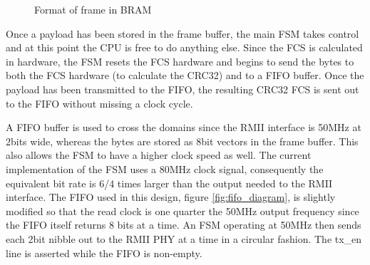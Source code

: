 \begin{figure}[h!]
    \centering
    \caption{Format of frame in BRAM}
    \label{fig:bram_frame_format}
\end{figure}


Once a payload has been stored in the frame buffer, the main FSM takes control and at this point the CPU is free to do anything else. Since the FCS is calculated in hardware, the FSM resets the FCS hardware and begins to send the bytes to both the FCS hardware (to calculate the CRC32) and to a FIFO buffer. Once the payload has been transmitted to the FIFO, the resulting CRC32 FCS is sent out to the FIFO without missing a clock cycle. 

A FIFO buffer is used to cross the domains since the RMII interface is 50MHz at 2bits wide, whereas the bytes are stored as 8bit vectors in the frame buffer. This also allows the FSM to have a higher clock speed as well. The current implementation of the FSM uses a 80MHz clock signal, consequently the equivalent bit rate is 6/4 times larger than the output needed to the RMII interface. The FIFO used in this design, figure \ref{fig:fifo_diagram}, is slightly modified so that the read clock is one quarter the 50MHz output frequency since the FIFO itself returns 8 bits at a time. An FSM operating at 50MHz then sends each 2bit nibble out to the RMII PHY at a time in a circular fashion. The tx\_en line is asserted while the FIFO is non-empty.


